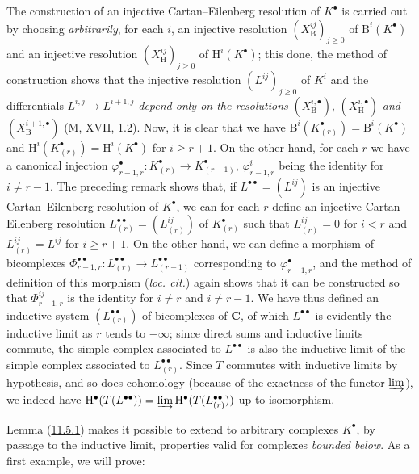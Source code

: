 The construction of an injective Cartan--Eilenberg resolution of $K^\bullet$
is carried out by choosing \emph{arbitrarily}, for each $i$, an injective resolution
$(X_{\mathrm B}^{ij})_{j\geq0}$ of $\mathrm B^i(K^\bullet)$ and an injective
resolution $(X_{\mathrm H}^{ij})_{j\geq0}$ of
$\mathrm H^i(K^\bullet)$; this done, the method of construction shows that
the injective resolution $(L^{ij})_{j\geq0}$ of $K^i$ and the
differentials $L^{i,j}\to L^{i+1,j}$ \emph{depend only on the resolutions}
$(X_{\mathrm B}^{i,\bullet})$, $(X_{\mathrm H}^{i,\bullet})$ \emph{and}
$(X_{\mathrm B}^{i+1,\bullet})$ (M, XVII, 1.2). Now, it is clear that we have
$\mathrm B^i(K_{(r)}^\bullet)=\mathrm B^i(K^\bullet)$ and
$\mathrm H^i(K_{(r)}^\bullet)=\mathrm H^i(K^\bullet)$ for $i\geq r+1$. On
the other hand, for each $r$ we have a canonical injection
$\varphi_{r-1,r}^\bullet:K_{(r)}^\bullet\to K_{(r-1)}^\bullet$,
$\varphi_{r-1,r}^i$ being the identity for $i\neq r-1$. The preceding remark
shows that, if $L^{\bullet\bullet}=(L^{ij})$ is an injective
Cartan--Eilenberg resolution of $K^\bullet$, we can for each $r$ define an
injective Cartan--Eilenberg resolution
$L_{(r)}^{\bullet\bullet}=(L_{(r)}^{ij})$ of $K_{(r)}^\bullet$ such that
$L_{(r)}^{ij}=0$ for $i<r$ and $L_{(r)}^{ij}=L^{ij}$ for $i\geq r+1$. On the
other hand, we can define a morphism of bicomplexes
$\Phi_{r-1,r}^{\bullet\bullet}:L_{(r)}^{\bullet\bullet}\to
L_{(r-1)}^{\bullet\bullet}$ corresponding to $\varphi_{r-1,r}^\bullet$, and the
method of definition of this morphism (\emph{loc. cit.}) again shows that it
can be constructed so that $\Phi_{r-1,r}^{ij}$ is the identity for
$i\neq r$ and $i\neq r-1$. We have thus defined an inductive system
$(L_{(r)}^{\bullet\bullet})$ of bicomplexes of $\boldsymbol{C}$, of which
$L^{\bullet\bullet}$ is evidently the inductive limit as $r$ tends to
$-\infty$; since direct sums and inductive limits commute, the simple
complex associated to $L^{\bullet\bullet}$ is also the inductive limit
of the simple complex associated to $L_{(r)}^{\bullet\bullet}$. Since $T$
commutes with inductive limits by hypothesis, and so does
cohomology (because of the exactness of the functor $\varinjlim$), we indeed have $\mathrm H^\bullet(T(L^{\bullet\bullet}))=\varinjlim\mathrm H^\bullet(T(L_{(r)}^{\bullet\bullet}))$
up to isomorphism.

Lemma (\hyperref[0.11.5.1]{11.5.1}) makes it possible to extend to arbitrary complexes
$K^\bullet$, by passage to the inductive limit, properties
valid for complexes \emph{bounded below}. As a first
example, we will prove:

